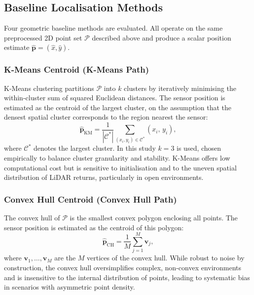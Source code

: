 \documentclass[lettersize,journal]{IEEEtran}
\begin{document}
\subsection{Baseline Localisation Methods}

Four geometric baseline methods are evaluated. All operate on the same
preprocessed 2D point set $\mathcal{P}$ described above and produce a
scalar position estimate $\hat{\mathbf{p}} = (\hat{x}, \hat{y})$.

\subsubsection{K-Means Centroid (K-Means Path)}

K-Means clustering \cite{kocic2018sensors} partitions $\mathcal{P}$ into
$k$ clusters by iteratively minimising the within-cluster sum of squared
Euclidean distances. The sensor position is estimated as the centroid of
the largest cluster, on the assumption that the densest spatial cluster
corresponds to the region nearest the sensor:
\begin{equation}
  \hat{\mathbf{p}}_{\text{KM}} = \frac{1}{|\mathcal{C}^*|}
  \sum_{(x_i,y_i) \in \mathcal{C}^*} (x_i,\, y_i),
  \label{eq:kmeans}
\end{equation}
where $\mathcal{C}^*$ denotes the largest cluster. In this study $k{=}3$
is used, chosen empirically to balance cluster granularity and stability.
K-Means offers low computational cost but is sensitive to initialisation
and to the uneven spatial distribution of LiDAR returns, particularly
in open environments.

\subsubsection{Convex Hull Centroid (Convex Hull Path)}

The convex hull of $\mathcal{P}$ is the smallest convex polygon enclosing
all points. The sensor position is estimated as the centroid of this polygon:
\begin{equation}
  \hat{\mathbf{p}}_{\text{CH}} = \frac{1}{M}
  \sum_{j=1}^{M} \mathbf{v}_j,
  \label{eq:convexhull}
\end{equation}
where $\mathbf{v}_1, \ldots, \mathbf{v}_M$ are the $M$ vertices of the
convex hull. While robust to noise by construction, the convex hull
oversimplifies complex, non-convex environments and is insensitive to the
internal distribution of points, leading to systematic bias in scenarios
with asymmetric point density.
\end{document}
